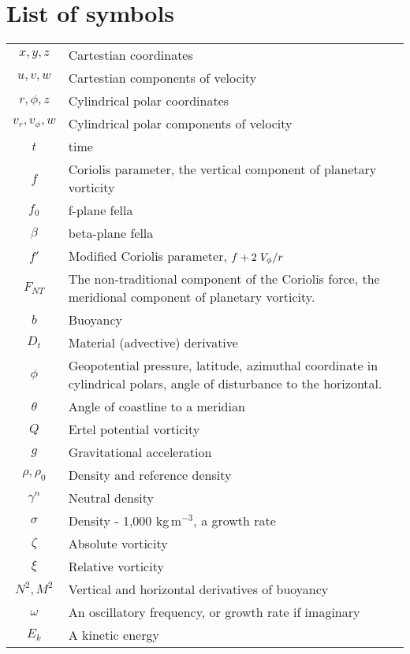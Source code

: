 \chapter*{List of symbols}

\begin{tabular}{cp{\textwidth}}
    $x, y, z$ & Cartestian coordinates \\
    $u, v, w$ & Cartestian components of velocity \\
    $r, \phi, z$ & Cylindrical polar coordinates \\
    $v_r, v_\phi, w$ & Cylindrical polar components of velocity \\
    $t$ & time \\
    $f$ & Coriolis parameter, the vertical component of planetary vorticity \\
    $f_0$ & f-plane fella \\
    $\beta$ & beta-plane fella \\
    $f'$ & Modified Coriolis parameter, $f + 2 \flatfrac{V_\phi}{r}$ \\
    $F_{NT}$ & The non-traditional component of the Coriolis force, the meridional component of planetary vorticity. \\
    $b$ & Buoyancy \\
    $D_t$ & Material (advective) derivative \\
    $\phi$ & Geopotential pressure, latitude, azimuthal coordinate in cylindrical polars, angle of disturbance to the horizontal. \\
    $\theta$ & Angle of coastline to a meridian \\
    $Q$ & Ertel potential vorticity \\
    $g$ & Gravitational acceleration \\
    $\rho, \rho_0$ & Density and reference density \\
    $\gamma^n$ & Neutral density \\
    $\sigma$ & Density - 1,000 kg$\,$m$^{-3}$, a growth rate \\
    $\zeta$ & Absolute vorticity \\
    $\xi$ & Relative vorticity \\
    $N^2, M^2$ & Vertical and horizontal derivatives of buoyancy \\
    $\omega$ & An oscillatory frequency, or growth rate if imaginary \\
    $E_k$ & A kinetic energy \\

\end{tabular}

